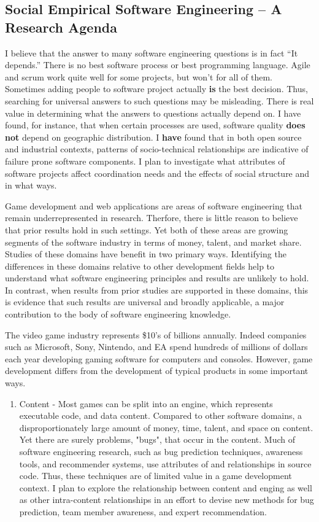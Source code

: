 \documentclass[10pt]{article}
\newcommand\Section[1]{\section*{#1}}
\begin{document}
\begin{small}
\Section{Social Empirical Software Engineering -- A Research Agenda}


I believe that the answer to many software engineering questions is in fact
``It depends.'' There is no best software process or best programming
language.  Agile and scrum work quite well for some projects, but won't for all
of them.  Sometimes adding people to software project actually \textbf{is} the
best decision.  Thus, searching for universal answers to such questions may be
misleading.  There is real value in determining what the answers to questions
actually depend on.  I have found, for instance, that when certain processes
are used, software quality \textbf{does not} depend on geographic distribution.
I \textbf{have} found that in both open source and industrial contexts,
patterns of socio-technical relationships are indicative of failure prone
software components.  I plan to investigate what attributes of software
projects affect coordination needs and the effects of social structure and in what
ways. 

Game development and web applications are areas of software engineering that
remain underrepresented in research.  Therfore, there is little reason to believe
that prior results hold in such settings.  Yet both of these areas are growing
segments of the software industry in terms of money, talent, and market share.
Studies of these domains have benefit in two primary ways.  Identifying the
differences in these domains relative to other development fields help to
understand what software engineering principles and results are unlikely to
hold.  In contrast, when results from prior studies are supported
in these domains, this is evidence that such results are universal and broadly
applicable, a major contribution to the body of software engineering knowledge.

The video game industry represents \$10's of billions annually. Indeed
companies such as Microsoft, Sony, Nintendo, and EA spend hundreds of
millions of dollars each year developing gaming software for computers and
consoles.  However, game development differs from the development of typical
products in some important ways.

\begin{enumerate}

\item Content - Most games can be split into an engine, which represents executable code,
    and data content.  Compared to other software domains, a disproportionately large
    amount of money, time, talent, and space on content.  Yet there are surely problems,
    "bugs", that occur in the content.  Much of software engineering research, such as
    bug prediction techniques, awareness tools, and recommender systems, use attributes
    of and relationships in source code.  Thus, these techniques are of limited value
    in a game development context.  I plan to explore the relationship between content
    and enging as well as other intra-content relationships in an effort to devise new
    methods for bug prediction, team member awareness, and expert recommendation.


\end{enumerate}
\end{small}
\end{document}
